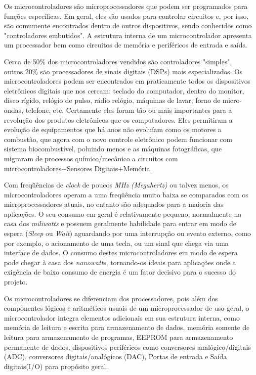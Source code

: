 \documentclass[final,12pt, times, 5p, twocolumn]{elsarticle}
\begin{document}
Os microcontroladores são microprocessadores que podem ser programados para funções específicas. Em geral, eles são usados para controlar circuitos e, por isso, são comumente encontrados dentro de outros dispositivos, sendo conhecidos como "controladores embutidos". A estrutura interna de um microcontrolador apresenta um processador bem como circuitos de memória e periféricos de entrada e saída.

Cerca de 50\% dos microcontroladores vendidos são controladores "simples", outros 20\% são processadores de sinais digitais (DSPs) mais especializados. Os microcontroladores podem ser encontrados em praticamente todos os dispositivos eletrônicos digitais que nos cercam: teclado do computador, dentro do monitor, disco rígido, relógio de pulso, rádio relógio, máquinas de lavar, forno de micro-ondas, telefone, etc. Certamente eles foram tão ou mais importantes para a revolução dos produtos eletrônicos que os computadores. Eles permitiram a evolução de equipamentos que há anos não evoluíam  como os motores a combustão, que agora com o novo controle eletrônico podem funcionar com sistema biocombustível, poluindo menos e as máquinas fotográficas, que migraram de processos químico/mecânico a circuitos com microcontroladores+Sensores Digitais+Memória.

Com freqüências de {\it clock} de poucos {\it MHz (Megahertz)} ou talvez menos, os microcontroladores operam a uma freqüência muito baixa se comparados com os microprocessadores atuais, no entanto são adequados para a maioria das aplicações. O seu consumo em geral é relativamente pequeno, normalmente na casa dos {\it miliwatts} e possuem geralmente habilidade para entrar em modo de espera ({\it Sleep} ou {\it Wait}) aguardando por uma interrupção ou evento externo, como por exemplo, o acionamento de uma tecla, ou um sinal que chega via uma interface de dados. O consumo destes microcontroladores em modo de espera pode chegar à casa dos {\it nanowatts}, tornando-os ideais para aplicações onde a exigência de baixo consumo de energia é um fator decisivo para o sucesso do projeto.

Os microcontroladores se diferenciam dos processadores, pois além dos componentes lógicos e aritméticos usuais de um microprocessador de uso geral, o microcontrolador integra elementos adicionais em sua estrutura interna, como memória de leitura e escrita para armazenamento de dados, memória somente de leitura para armazenamento de programas, EEPROM para armazenamento permanente de dados, dispositivos periféricos como conversores analógico/digitais (ADC), conversores digitais/analógicos (DAC), Portas de entrada e Saída digitais(I/O) para propósito geral.
\end{document}
